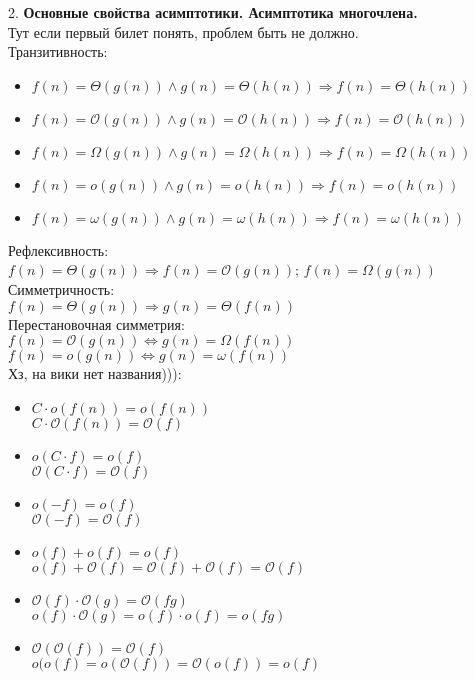 \documentclass[12pt]{article}
\begin{document}
2. \textbf{Основные свойства асимптотики. Асимптотика многочлена.}\\
Тут если первый билет понять, проблем быть не должно.\\
Транзитивность:
\begin{itemize}
    \item $f(n) = \Theta (g(n)) \land g(n) = \Theta (h(n)) \Rightarrow f(n) = \Theta (h(n))$
    \item $f(n) = \mathcal{O} (g(n)) \land g(n) = \mathcal{O} (h(n)) \Rightarrow f(n) = \mathcal{O} (h(n))$
    \item $f(n) = \Omega (g(n)) \land g(n) = \Omega (h(n)) \Rightarrow f(n) = \Omega (h(n))$
    \item $f(n) = o(g(n)) \land g(n) = o(h(n)) \Rightarrow f(n) = o(h(n))$
    \item $f(n) = \omega (g(n)) \land g(n) = \omega (h(n)) \Rightarrow f(n) = \omega (h(n))$
\end{itemize}
Рефлексивность:\\
$f(n) = \Theta (g(n)) \Rightarrow f(n) = \mathcal{O}(g(n))$; $f(n) = \Omega(g(n))$\\
Симметричность:\\
$f(n) = \Theta (g(n)) \Rightarrow g(n) = \Theta (f(n))$\\
Перестановочная симметрия:\\
$f(n) = \mathcal{O}(g(n)) \Leftrightarrow g(n) = \Omega(f(n))$\\
$f(n) = o(g(n)) \Leftrightarrow g(n) = \omega(f(n))$\\
Хз, на вики нет названия))):
\begin{itemize}
    \item $C \cdot o(f(n)) = o(f(n))$\\
    $C \cdot \mathcal{O}(f(n)) = \mathcal{O}(f)$
    \item $o(C \cdot f) = o(f)$\\
    $\mathcal{O}(C \cdot f) = \mathcal{O}(f)$
    \item $o(-f) = o(f)$\\
    $\mathcal{O}(-f) = \mathcal{O}(f)$
    \item $o(f) + o(f) = o(f)$\\
    $o(f) + \mathcal{O}(f) = \mathcal{O}(f) + \mathcal{O}(f) = \mathcal{O}(f)$
    \item $\mathcal{O}(f) \cdot \mathcal{O}(g) = \mathcal{O}(fg)$\\
    $o(f) \cdot \mathcal{O}(g) = o(f) \cdot o(f) = o(fg)$
    \item $\mathcal{O}(\mathcal{O}(f)) = \mathcal{O}(f)$\\
    $o(o(f) = o(\mathcal{O}(f)) = \mathcal{O}(o(f)) = o(f)$
\end{itemize}
\end{document}

